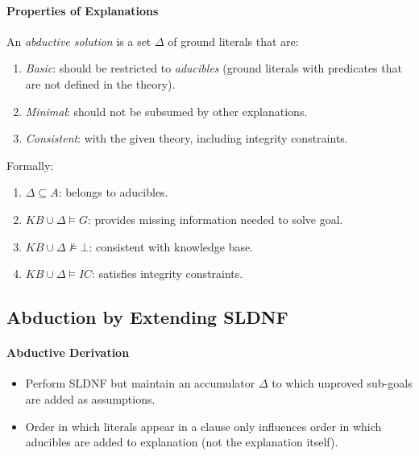 \documentclass[twocolumn,english]{article}
\begin{document}
\paragraph{Properties of Explanations}

An \emph{abductive solution} is a set $\Delta$ of ground literals
that are:
\begin{enumerate}
\item \emph{Basic}: should be restricted to \emph{aducibles} (ground literals
with predicates that are not defined in the theory).
\item \emph{Minimal}: should not be subsumed by other explanations.
\item \emph{Consistent}: with the given theory, including integrity constraints.
\end{enumerate}
Formally:
\begin{enumerate}
\item $\Delta\subseteq A$: belongs to aducibles.
\item $KB\cup\Delta\vDash G$: provides missing information needed to solve
goal.
\item $KB\cup\Delta\not\vDash\bot$: consistent with knowledge base.
\item $KB\cup\Delta\vDash IC$: satisfies integrity constraints.
\end{enumerate}

\subsection{Abduction by Extending SLDNF}

\paragraph{Abductive Derivation}
\begin{itemize}
\item Perform SLDNF but maintain an accumulator $\Delta$ to which unproved
sub-goals are added as assumptions.
\item Order in which literals appear in a clause only influences order in
which aducibles are added to explanation (not the explanation itself).
\end{itemize}
\end{document}
